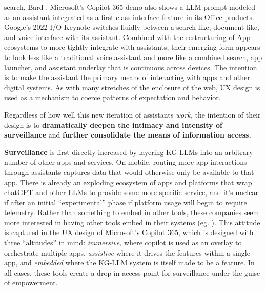 \documentclass{article}
\begin{document}
search, Bard \cite{eliasGoogleReshufflesVirtual2023} .
Microsoft's Copilot 365 demo also shows a LLM prompt modeled as an
assistant integrated as a first-class interface feature in its Office
products. Google's 2022 I/O Keynote switches fluidly between a
search-like, document-like, and voice interface with its assistant.
Combined with the restructuring of App ecosystems to more tightly
integrate with assistants, their emerging form appears to look less like
a traditional voice assistant and more like a combined search, app
launcher, and assistant underlay that is continuous across devices. The
intention is to make the assistant the primary means of interacting with
apps and other digital systems. As with many stretches of the enclosure
of the web, UX design is used as a mechanism to coerce patterns of
expectation and behavior.

Regardless of how well this new iteration of assistants \emph{work,} the
intention of their design is to \textbf{dramatically deepen the intimacy
and intensity of surveillance} and \textbf{further consolidate the means
of information access.}

\textbf{Surveillance} is first directly increased by layering KG-LLMs
into an arbitrary number of other apps and services. On mobile, routing
more app interactions through assistants captures data that would
otherwise only be available to that app. There is already an exploding
ecosystem of apps and platforms that wrap chatGPT and other LLMs to
provide some more specific service, and it's unclear if after an initial
``experimental'' phase if platform usage will begin to require
telemetry. Rather than something to embed in other tools, these
companies seem more interested in having other tools embed in their
systems (eg. \cite{microsoftgraphdeveloperdocumentationMicrosoftGraphConnectors2022} ).
This attitude is captured in the UX design of Microsoft's Copilot 365,
which is designed with three ``altitudes'' in mind: \emph{immersive,}
where copilot is used as an overlay to orchestrate multiple apps,
\emph{assistive} where it drives the features within a single app, and
\emph{embedded} where the KG-LLM system is itself made to be a feature.
In all cases, these tools create a drop-in access point for surveillance
under the guise of empowerment.
\end{document}
